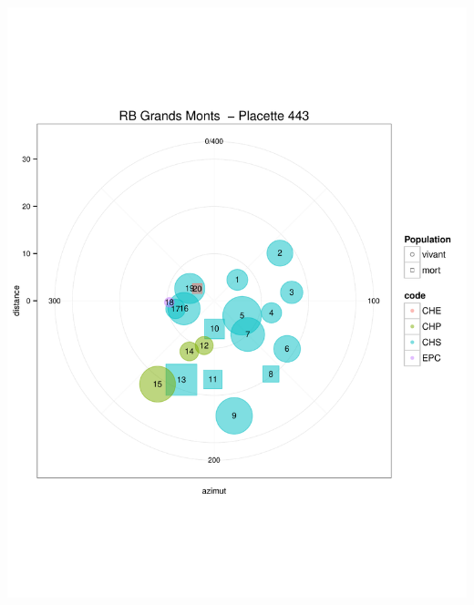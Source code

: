 \documentclass[a4paper]{book}\usepackage[]{graphicx}\usepackage[]{color}
\makeatletter
\def\maxwidth{ %
  \ifdim\Gin@nat@width>\linewidth
    \linewidth
  \else
    \Gin@nat@width
  \fi
}
\newenvironment{knitrout}{}{} %
\makeatother
\begin{document}
\begin{knitrout}
{\centering \includegraphics[width=\maxwidth]{Figures/PlanArbres-45} 

}





\end{knitrout}
\end{document}
